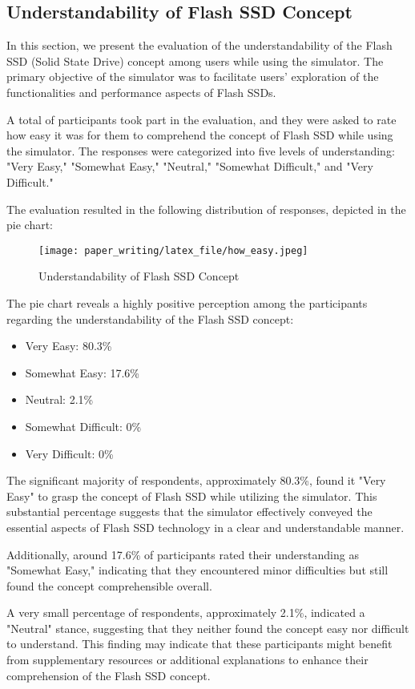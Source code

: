 \documentclass[conference]{/home/habib/Desktop/flash_ssd_simulator_web/paper_writing/latex_file/IEEEtran}
\begin{document}
\subsection{Understandability of Flash SSD Concept}
In this section, we present the evaluation of the understandability of the Flash SSD (Solid State Drive) concept among users while using the simulator. The primary objective of the simulator was to facilitate users' exploration of the functionalities and performance aspects of Flash SSDs.

A total of participants took part in the evaluation, and they were asked to rate how easy it was for them to comprehend the concept of Flash SSD while using the simulator. The responses were categorized into five levels of understanding: "Very Easy," "Somewhat Easy," "Neutral," "Somewhat Difficult," and "Very Difficult."

The evaluation resulted in the following distribution of responses, depicted in the pie chart:
\begin{figure}[h]
    \centering
    \texttt{[image: paper\_writing/latex\_file/how\_easy.jpeg]}
    \caption{Understandability of Flash SSD Concept}
    \label{fig:enter-label}
\end{figure}
The pie chart reveals a highly positive perception among the participants regarding the understandability of the Flash SSD concept:
\begin{itemize}
    \item Very Easy: 80.3\%
    \item Somewhat Easy: 17.6\%
    \item Neutral: 2.1\%
    \item Somewhat Difficult: 0\%
    \item Very Difficult: 0\%
\end{itemize}
The significant majority of respondents, approximately 80.3\%, found it "Very Easy" to grasp the concept of Flash SSD while utilizing the simulator. This substantial percentage suggests that the simulator effectively conveyed the essential aspects of Flash SSD technology in a clear and understandable manner.

Additionally, around 17.6\% of participants rated their understanding as "Somewhat Easy," indicating that they encountered minor difficulties but still found the concept comprehensible overall.

A very small percentage of respondents, approximately 2.1\%, indicated a "Neutral" stance, suggesting that they neither found the concept easy nor difficult to understand. This finding may indicate that these participants might benefit from supplementary resources or additional explanations to enhance their comprehension of the Flash SSD concept.
\end{document}
